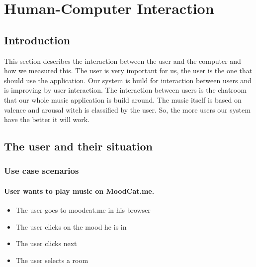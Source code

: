 \chapter{Human-Computer Interaction }

\section{Introduction}
This section describes the interaction between the user and the computer and how we measured this.
The user is very important for us, the user is the one that should use the application.
Our system is build for interaction between users and is improving by user interaction.
The interaction between users is the chatroom that our whole music application is build around.
The music itself is based on valence and arousal witch is classified by the user.
So, the more users our system have the better it will work.




\section{The user and their situation}


\subsection{Use case scenarios}

\subsubsection{User wants to play music on MoodCat.me.}
\begin{itemize}
\item The user goes to moodcat.me in his browser
\item The user clicks on the mood he is in
\item The user clicks next
\item The user selects a room
\end{itemize}


